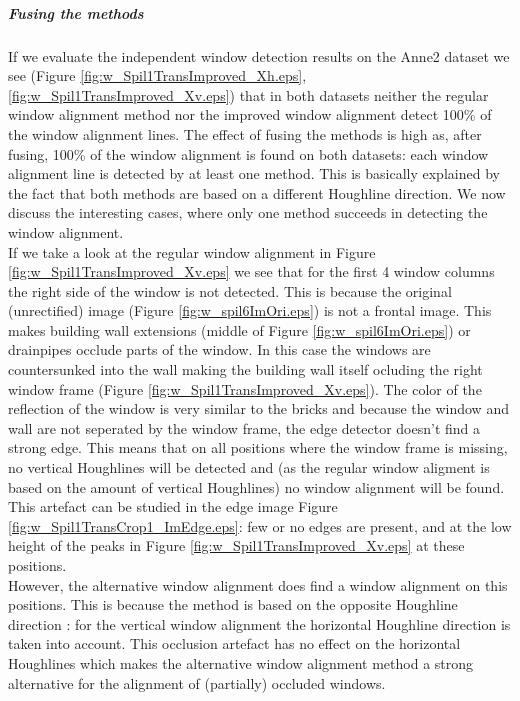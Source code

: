 \subparagraph{Fusing the methods}
If we evaluate the independent window detection results on the Anne2 dataset we see (Figure
\ref{fig:w_Spil1TransImproved_Xh.eps}, \ref{fig:w_Spil1TransImproved_Xv.eps})
that in both datasets neither the regular window alignment method nor the
improved window alignment detect 100\% of the window alignment lines.  The
effect of fusing the methods is high as, after fusing, 100\% of the window
alignment is found on both datasets: each window alignment line is detected by
at least one method.  This is basically explained by the fact that both methods
are based on a different Houghline direction.  We now discuss the interesting
cases, where only one method succeeds in detecting the window alignment.\\

\label{lab:occlusion} If we take a look at the regular window alignment in
Figure \ref{fig:w_Spil1TransImproved_Xv.eps} we see that for the first 4 window
columns the right side of the window is not detected.  This is because the
original (unrectified) image (Figure \ref{fig:w_spil6ImOri.eps}) is not a
frontal image.  This makes building wall extensions (middle of Figure
\ref{fig:w_spil6ImOri.eps}) or drainpipes occlude parts of the window.  In this
case the windows are countersunked into the wall making the building wall itself
ocluding the right window frame (Figure \ref{fig:w_Spil1TransImproved_Xv.eps}).
The color of the reflection of the window is very similar to the bricks and
because the window and wall are not seperated by the window frame, the edge
detector doesn't find a strong edge.  This means that on all positions where the
window frame is missing, no vertical Houghlines will be detected and (as the
regular window aligment is based on the amount of vertical Houghlines) no window
alignment will be found.  This artefact can be studied in the edge image Figure
\ref{fig:w_Spil1TransCrop1_ImEdge.eps}: few or no edges are present, and at the
low height of the peaks in Figure \ref{fig:w_Spil1TransImproved_Xv.eps} at these
positions.\\

However, the alternative window alignment does find a window alignment on this
positions. This is because the method is based on the opposite Houghline
direction : for the vertical window alignment the horizontal Houghline direction
is taken into account.  This occlusion artefact has no effect on the horizontal
Houghlines which makes the alternative window alignment method a strong
alternative for the alignment of (partially) occluded windows.\\

